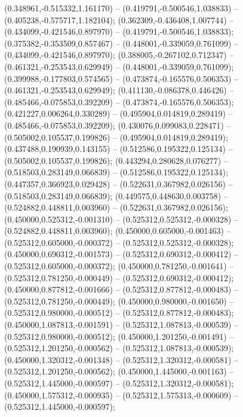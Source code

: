  (0.348961,-0.515332,1.161170) -- (0.419791,-0.500546,1.038833) -- (0.405238,-0.575717,1.182104);
 (0.362309,-0.436408,1.007744) -- (0.434099,-0.421546,0.897970) -- (0.419791,-0.500546,1.038833);
 (0.375382,-0.353509,0.857467) -- (0.448001,-0.339059,0.761099) -- (0.434099,-0.421546,0.897970);
 (0.388005,-0.267102,0.712347) -- (0.461321,-0.253543,0.629949) -- (0.448001,-0.339059,0.761099);
 (0.399988,-0.177803,0.574565) -- (0.473874,-0.165576,0.506353) -- (0.461321,-0.253543,0.629949);
 (0.411130,-0.086378,0.446426) -- (0.485466,-0.075853,0.392209) -- (0.473874,-0.165576,0.506353);
 (0.421227,0.006264,0.330289) -- (0.495904,0.014819,0.289419) -- (0.485466,-0.075853,0.392209);
 (0.430076,0.099083,0.228471) -- (0.505002,0.105537,0.199826) -- (0.495904,0.014819,0.289419);
 (0.437488,0.190939,0.143155) -- (0.512586,0.195322,0.125134) -- (0.505002,0.105537,0.199826);
 (0.443294,0.280628,0.076277) -- (0.518503,0.283149,0.066839) -- (0.512586,0.195322,0.125134);
 (0.447357,0.366923,0.029428) -- (0.522631,0.367982,0.026156) -- (0.518503,0.283149,0.066839);
 (0.449575,0.448630,0.003758) -- (0.524882,0.448811,0.003960) -- (0.522631,0.367982,0.026156);
 (0.450000,0.525312,-0.001310) -- (0.525312,0.525312,-0.000328) -- (0.524882,0.448811,0.003960);
 (0.450000,0.605000,-0.001463) -- (0.525312,0.605000,-0.000372) -- (0.525312,0.525312,-0.000328);
 (0.450000,0.690312,-0.001573) -- (0.525312,0.690312,-0.000412) -- (0.525312,0.605000,-0.000372);
 (0.450000,0.781250,-0.001641) -- (0.525312,0.781250,-0.000449) -- (0.525312,0.690312,-0.000412);
 (0.450000,0.877812,-0.001666) -- (0.525312,0.877812,-0.000483) -- (0.525312,0.781250,-0.000449);
 (0.450000,0.980000,-0.001650) -- (0.525312,0.980000,-0.000512) -- (0.525312,0.877812,-0.000483);
 (0.450000,1.087813,-0.001591) -- (0.525312,1.087813,-0.000539) -- (0.525312,0.980000,-0.000512);
 (0.450000,1.201250,-0.001491) -- (0.525312,1.201250,-0.000562) -- (0.525312,1.087813,-0.000539);
 (0.450000,1.320312,-0.001348) -- (0.525312,1.320312,-0.000581) -- (0.525312,1.201250,-0.000562);
 (0.450000,1.445000,-0.001163) -- (0.525312,1.445000,-0.000597) -- (0.525312,1.320312,-0.000581);
 (0.450000,1.575312,-0.000935) -- (0.525312,1.575313,-0.000609) -- (0.525312,1.445000,-0.000597);
